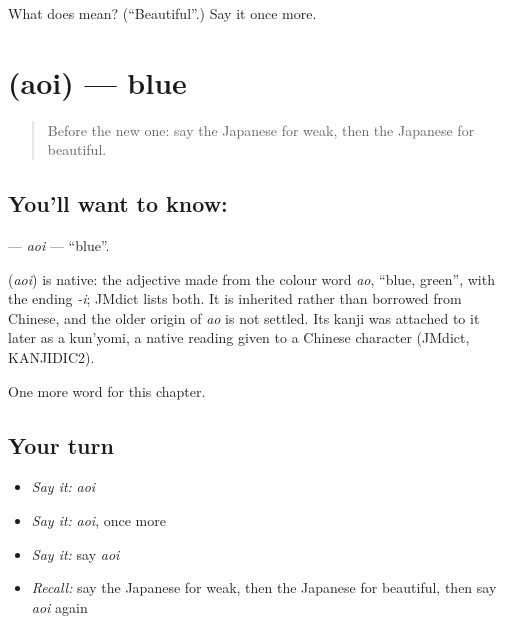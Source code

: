 \begin{tcolorbox}[breakable,colback=teal!4,colframe=teal!35!black,title={Before you move on}]
What does  mean? (\textquotedblleft{}Beautiful\textquotedblright{}.) Say it once more.
\end{tcolorbox}
\section[\texorpdfstring{\ja{あおい} (aoi)}{あおい (aoi)}]{ (aoi) — blue}

\label{lesson:JA-C51-aoi}



\begin{quote}
Before the new one: say the Japanese for weak, then the Japanese for beautiful.
\end{quote}

\subsection*{You'll want to know: }
\textbf{} — \emph{aoi} — \textquotedblleft{}blue\textquotedblright{}.

\begin{cousinweb}
\textbf{} (\emph{aoi}) is native: the adjective made from the colour word \emph{ao}, \textquotedblleft{}blue, green\textquotedblright{}, with the ending \emph{-i}; JMdict lists both. It is inherited rather than borrowed from Chinese, and the older origin of \emph{ao} is not settled. Its kanji was attached to it later as a kun'yomi, a native reading given to a Chinese character (JMdict, KANJIDIC2).
\end{cousinweb}

\begin{grammarlens}[title={What you've built}]
One more word for this chapter.
\end{grammarlens}

\subsection*{Your turn}
\begin{itemize}
\raggedright
  \item \emph{Say it:} \emph{aoi}
  \item \emph{Say it:} \emph{aoi}, once more
  \item \emph{Say it:} say \emph{aoi}
  \item \emph{Recall:} say the Japanese for weak, then the Japanese for beautiful, then say \emph{aoi} again
\end{itemize}

